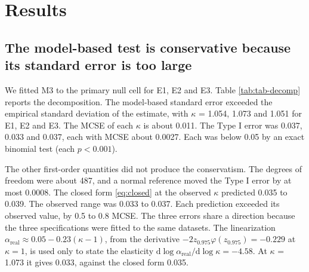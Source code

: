 \documentclass[
  11pt,
]{article}
\begin{document}
\section{Results}\label{results}

\subsection{The model-based test is conservative because its standard error is too large}\label{the-model-based-test-is-conservative-because-its-standard-error-is-too-large}

We fitted M3 to the primary null cell for E1, E2 and E3. Table
\ref{tab:tab-decomp} reports the decomposition. The model-based
standard error exceeded the empirical standard deviation of the
estimate, with \(\kappa\) = 1.054,
1.073 and 1.051 for E1, E2 and
E3. The MCSE of each \(\kappa\) is about
0.011. The Type I error was
0.037, 0.033 and 0.037,
each with MCSE about 0.0027. Each was below 0.05 by
an exact binomial test
(each \(p < 0.001\)).

\begin{table}
\centering
\caption{\label{tab:tab-decomp}First-order decomposition at the primary null cell (Hybrid, $N = 70$, $c_{bm} = 0$), production model M3 with the fitted mean. Extended DGP ($c_\times = 0.2$, carryover decaying from the last on-drug mean). Fits that failed are excluded, not refitted without the residual correlation. Closed form is the closed-form size of Section 2.1 at the observed $\kappa$ and df.}
\centering
{}
\end{table}

The other first-order quantities did not produce the conservatism.
The degrees of freedom were about 487,
and a normal reference moved the Type I error by at most
0.0008. The closed form \eqref{eq:closed}
at the observed \(\kappa\) predicted 0.035 to
0.039. The observed range was 0.033 to
0.037. Each prediction exceeded its observed value, by
0.5 to
0.8 MCSE. The
three errors share a direction because the three specifications were
fitted to the same datasets. The linearization
\(\alpha_{\mathrm{real}} \approx 0.05 - 0.23(\kappa - 1)\), from the
derivative \(-2 z_{0.975}\varphi(z_{0.975}) = -0.229\) at \(\kappa = 1\),
is used only to state the elasticity
\(\mathrm{d}\log\alpha_{\mathrm{real}}/\mathrm{d}\log\kappa = -4.58\).
At \(\kappa\) = 1.073 it gives
0.033, against the closed form 0.035.
\end{document}
